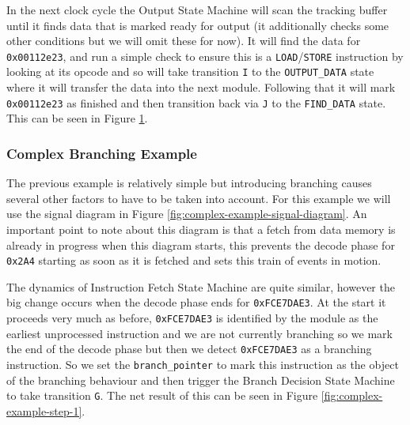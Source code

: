 In the next clock cycle the Output State Machine will scan the tracking buffer until it finds data that is marked ready for output (it additionally checks some other conditions but we will omit these for now). It will find the data for \texttt{0x00112e23}, and run a simple check to ensure this is a \texttt{LOAD}/\texttt{STORE} instruction by looking at its opcode and so will take transition \texttt{I} to the \texttt{OUTPUT\_DATA} state where it will transfer the data into the next module. Following that it will mark \texttt{0x00112e23} as finished and then transition back via \texttt{J} to the \texttt{FIND\_DATA} state. This can be seen in Figure \ref{fig:load-example-step-4}.

\begin{figure}[htbp]
	\begin{subfigure}{\linewidth}
		
	\end{subfigure}
	\begin{subfigure}{\linewidth}
		
	\end{subfigure}
	\caption{}
	\label{fig:load-example-step-4}
\end{figure}

\subsubsection{Complex Branching Example}

The previous example is relatively simple but introducing branching causes several other factors to have to be taken into account. For this example we will use the signal diagram in Figure \ref{fig:complex-example-signal-diagram}. An important point to note about this diagram is that a fetch from data memory is already in progress when this diagram starts, this prevents the decode phase for \texttt{0x2A4} starting as soon as it is fetched and sets this train of events in motion.

\begin{sidewaysfigure}[htbp]
	
	\caption{}
	\label{fig:complex-example-signal-diagram}
\end{sidewaysfigure}

The dynamics of Instruction Fetch State Machine are quite similar, however the big change occurs when the decode phase ends for \texttt{0xFCE7DAE3}. At the start it proceeds very much as before, \texttt{0xFCE7DAE3} is identified by the module as the earliest unprocessed instruction and we are not currently branching so we mark the end of the decode phase but then we detect \texttt{0xFCE7DAE3} as a branching instruction. So we set the \texttt{branch\_pointer} to mark this instruction as the object of the branching behaviour and then trigger the Branch Decision State Machine to take transition \texttt{G}. The net result of this can be seen in Figure \ref{fig:complex-example-step-1}.

